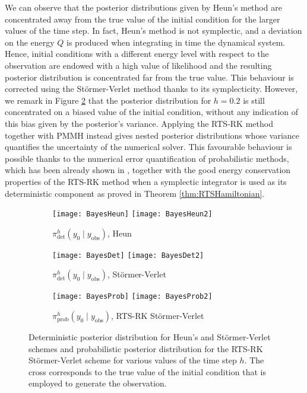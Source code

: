 \documentclass[10pt]{article}
\begin{document}
We can observe that the posterior distributions given by Heun's method are concentrated away from the true value of the initial condition for the larger values of the time step. In fact, Heun's method is not symplectic, and a deviation on the energy $Q$ is produced when integrating in time the dynamical system. Hence, initial conditions with a different energy level with respect to the observation are endowed with a high value of likelihood and the resulting posterior distribution is concentrated far from the true value. This behaviour is corrected using the Störmer-Verlet method thanks to its symplecticity. However, we remark in Figure \ref{fig:BayesB} that the posterior distribution for $h = 0.2$ is still concentrated on a biased value of the initial condition, without any indication of this bias given by the posterior's variance. Applying the RTS-RK method together with PMMH instead gives nested posterior distributions whose variance quantifies the uncertainty of the numerical solver. This favourable behaviour is possible thanks to the numerical error quantification of probabilistic methods, which has been already shown in \cite{AbG18, CGS16, COS17}, together with the good energy conservation properties of the RTS-RK method when a symplectic integrator is used as its deterministic component as proved in Theorem \ref{thm:RTSHamiltonian}.

\begin{figure}
\begin{subfigure}{\textwidth}
	\centering
	\texttt{[image: BayesHeun]}
	\texttt{[image: BayesHeun2]}
	\caption{$\pi^h_{\mathrm{det}}(y_0\mid y_{\mathrm{obs}})$, Heun}
	\label{fig:BayesA}
\end{subfigure}	
\begin{subfigure}{\textwidth}
	\centering
	\texttt{[image: BayesDet]}
	\texttt{[image: BayesDet2]}
	\caption{$\pi^h_{\mathrm{det}}(y_0\mid y_{\mathrm{obs}})$, Störmer-Verlet}
	\label{fig:BayesB}
\end{subfigure}
\begin{subfigure}{\textwidth}
	\centering
	\texttt{[image: BayesProb]}
	\texttt{[image: BayesProb2]}
	\caption{$\pi^h_{\mathrm{prob}}(y_0\mid y_{\mathrm{obs}})$, RTS-RK Störmer-Verlet}
	\label{fig:BayesC}
\end{subfigure}
\caption{Deterministic posterior distribution for Heun's and Störmer-Verlet schemes and probabilistic posterior distribution for the RTS-RK Störmer-Verlet scheme for various values of the time step $h$. The cross corresponds to the true value of the initial condition that is employed to generate the observation.}
\label{fig:Bayes}
\end{figure}
\end{document}
